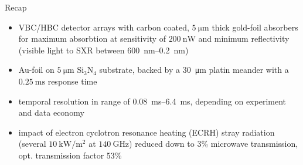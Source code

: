 \documentclass[final]{beamer}
\begin{document}
\begin{frame}
\begin{minipage}[t]{0.30\textwidth}
\begin{kasten}{\large%
                Recap}
                \large{{\color{ipp}}}%
                \vspace*{0.5cm}\small{%
                \begin{itemize}%
                    \item{%
                        VBC/HBC detector arrays with carbon coated, %
                        $\SI{5}{\micro\meter}$ thick gold-foil absorbers for %
                        maximum absorbtion at sensitivity of %
                        $\SI{200}{\nano\watt}$ and minimum reflectivity %
                        (visible light to SXR between %
                        \SIrange{600}{0.2}{\nano\meter})}%
                    \item{%
                        Au-foil on $\SI{5}{\micro\meter}$ Si$_{3}$N$_{4}$ %
                        substrate, backed by a \SI{30}{\micro\meter} platin %
                        meander with a $\SI{0.25}{\milli\second}$ response %
                        time}%
                    \item{%
                        temporal resolution in range of %
                        \SIrange{0.08}{6.4}{\milli\second}, depending on %
                        experiment and data economy}%
                    \item{%
                        impact of electron cyclotron resonance heating %
                        (ECRH) stray radiation (several %
                        $\SI{10}{\kilo\watt\per\square\meter}$ %
                        at $\SI{140}{\giga\hertz}$) reduced down to 3\% %
                        microwave transmission, opt. transmission factor 53\%}
                \end{itemize}}%
                \vspace*{1.0cm}%
                \begin{columns}%
\end{columns}
\end{kasten}
\end{minipage}
\end{frame}
\end{document}

